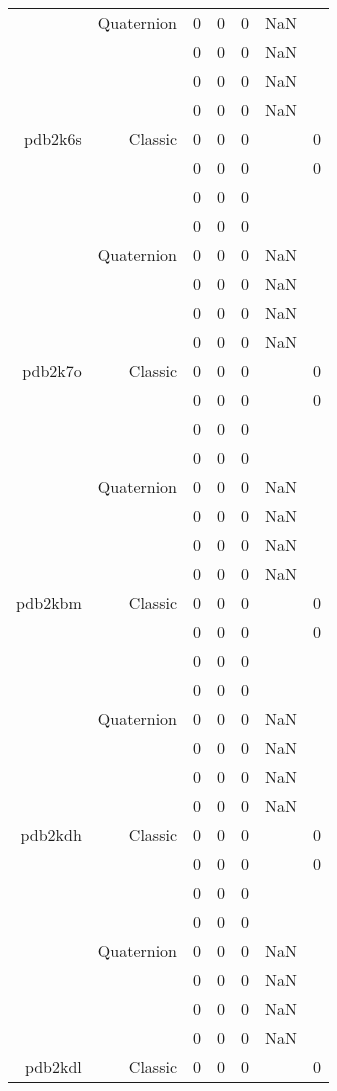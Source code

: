 \begin{xltabular}{\textwidth}{r|rcccSc}
& Quaternion & 0 & 0 & 0 & NaN & \\
& & 0 & 0 & 0 & NaN & \\
& & 0 & 0 & 0 & NaN & \\
& & 0 & 0 & 0 & NaN & \\ \addlinespace
pdb2k6s & Classic & 0 & 0 & 0 & & 0 \\
& & 0 & 0 & 0 & & 0 \\
& & 0 & 0 & 0 & & \\
& & 0 & 0 & 0 & & \\
& Quaternion & 0 & 0 & 0 & NaN & \\
& & 0 & 0 & 0 & NaN & \\
& & 0 & 0 & 0 & NaN & \\
& & 0 & 0 & 0 & NaN & \\ \addlinespace
pdb2k7o & Classic & 0 & 0 & 0 & & 0 \\
& & 0 & 0 & 0 & & 0 \\
& & 0 & 0 & 0 & & \\
& & 0 & 0 & 0 & & \\
& Quaternion & 0 & 0 & 0 & NaN & \\
& & 0 & 0 & 0 & NaN & \\
& & 0 & 0 & 0 & NaN & \\
& & 0 & 0 & 0 & NaN & \\ \addlinespace
pdb2kbm & Classic & 0 & 0 & 0 & & 0 \\
& & 0 & 0 & 0 & & 0 \\
& & 0 & 0 & 0 & & \\
& & 0 & 0 & 0 & & \\
& Quaternion & 0 & 0 & 0 & NaN & \\
& & 0 & 0 & 0 & NaN & \\
& & 0 & 0 & 0 & NaN & \\
& & 0 & 0 & 0 & NaN & \\ \addlinespace
pdb2kdh & Classic & 0 & 0 & 0 & & 0 \\
& & 0 & 0 & 0 & & 0 \\
& & 0 & 0 & 0 & & \\
& & 0 & 0 & 0 & & \\
& Quaternion & 0 & 0 & 0 & NaN & \\
& & 0 & 0 & 0 & NaN & \\
& & 0 & 0 & 0 & NaN & \\
& & 0 & 0 & 0 & NaN & \\ \addlinespace
pdb2kdl & Classic & 0 & 0 & 0 & & 0 \\

\end{xltabular}
